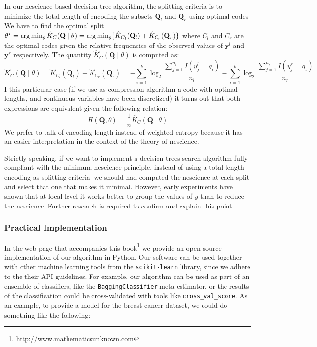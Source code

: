 In our nescience based decision tree algorithm, the splitting criteria is to minimize the total length of encoding the subsets $\mathbf{Q}_l$ and $\mathbf{Q}_r$ using optimal codes. We have to find the optimal split $ \theta^\star = \operatorname*{arg\,min}_\theta \hat{K}_C(\mathbf{Q} \mid \theta) = \operatorname*{arg\,min}_\theta \{ \hat{K}_{C_l}(\mathbf{Q}_l) + \hat{K}_{C_r}(\mathbf{Q}_r) \}$ where $C_l$ and $C_r$ are the optimal codes given the relative frequencies of the observed values of $\mathbf{y}^l$ and $\mathbf{y}^r$ respectively. The quantity $\hat{K}_C(\mathbf{Q} \mid \theta)$ is computed as:
\[
\hat{K}_C(\mathbf{Q} \mid \theta) = \hat{K}_{C_l}(\mathbf{Q}_l) + \hat{K}_{C_r}(\mathbf{Q}_r) = - \sum_{i=1}^k \log_2{ \frac{ \sum_{j=1}^{n_l} I(y^l_j = g_i)} {n_l} } - \sum_{i=1}^k \log_2{ \frac{ \sum_{j=1}^{n_r} I(y^r_j = g_i)} {n_r} }
\]
I this particular case (if we use as compression algorithm a code with optimal lengths, and continuous variables have been discretized) it turns out that both expressions are equivalent given the following relation:
\[
\tilde{H}(\mathbf{Q},\theta) = \frac{1}{n} \hat{K}_C(\mathbf{Q} \mid \theta)
\]
We prefer to talk of encoding length instead of weighted entropy because it has an easier interpretation in the context of the theory of nescience.

\begin{remark}
Strictly speaking, if we want to implement a decision trees search algorithm fully compliant with the minimum nescience principle, instead of using a total length encoding as splitting criteria, we should had computed the nescience at each split and select that one that makes it minimal. However, early experiments have shown that at local level it works better to group the values of $y$ than to reduce the nescience. Further research is required to confirm and explain this point.
\end{remark}

\subsubsection*{Practical Implementation}

In the web page that accompanies this book\footnote{http://www.mathematicsunknown.com} we provide an open-source implementation of our algorithm in Python. Our software can be used together with other machine learning tools from the \texttt{scikit-learn} library, since we adhere to the their API guidelines. For example, our algorithm can be used as part of an ensemble of classifiers, like the \texttt{BaggingClassifier} meta-estimator, or the results of the classification could be cross-validated with tools like \texttt{cross\_val\_score}. As an example, to provide a model for the breast cancer dataset, we could do something like the following:

